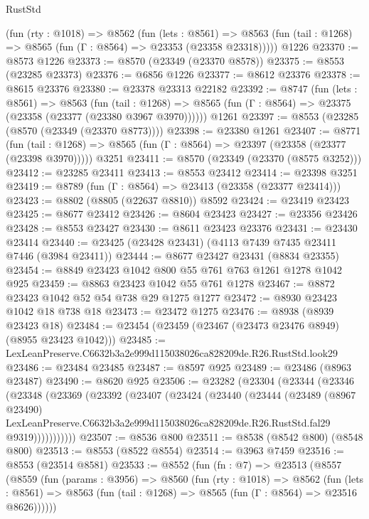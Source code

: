 \begin{lexlean}{RustStd}
\begin{coremodule}
    (fun (rty : @1018) =>
    @8562
      (fun (lets : @8561) =>
      @8563 (fun (tail : @1268) => @8565 (fun (Γ : @8564) => @23353 (@23358 @23318)))))
    @1226
@23370 := @8573 @1226
@23373 := @8570 (@23349 (@23370 @8578))
@23375 := @8553 (@23285 @23373)
@23376 := @6856 @1226
@23377 := @8612 @23376
@23378 := @8615 @23376
@23380 := @23378 @23313 @22182
@23392 := @8747
    (fun (lets : @8561) =>
    @8563
      (fun (tail : @1268) =>
      @8565 (fun (Γ : @8564) => @23375 (@23358 (@23377 (@23380 @3967 @3970))))))
    @1261
@23397 := @8553 (@23285 (@8570 (@23349 (@23370 @8773))))
@23398 := @23380 @1261
@23407 := @8771
    (fun (tail : @1268) => @8565 (fun (Γ : @8564) => @23397 (@23358 (@23377 (@23398 @3970)))))
    @3251
@23411 := @8570 (@23349 (@23370 (@8575 @3252)))
@23412 := @23285 @23411
@23413 := @8553 @23412
@23414 := @23398 @3251
@23419 := @8789 (fun (Γ : @8564) => @23413 (@23358 (@23377 @23414)))
@23423 := @8802 (@8805 (@22637 @8810)) @8592
@23424 := @23419 @23423
@23425 := @8677 @23412
@23426 := @8604 @23423
@23427 := @23356 @23426
@23428 := @8553 @23427
@23430 := @8611 @23423 @23376
@23431 := @23430 @23414
@23440 := @23425 (@23428 @23431) (@4113 @7439 @7435 @23411 @7446 (@3984 @23411))
@23444 := @8677 @23427 @23431 (@8834 @23355)
@23454 := @8849 @23423 @1042 @800 @55 @761 @763 @1261 @1278 @1042 @925
@23459 := @8863 @23423 @1042 @55 @761 @1278
@23467 := @8872 @23423 @1042 @52 @54 @738 @29 @1275 @1277
@23472 := @8930 @23423 @1042 @18 @738 @18
@23473 := @23472 @1275
@23476 := @8938 (@8939 @23423 @18)
@23484 := @23454 (@23459 (@23467 (@23473 @23476 @8949) (@8955 @23423 @1042)))
@23485 := LexLeanPreserve.C6632b3a2e999d115038026ca828209de.R26.RustStd.look29
@23486 := @23484 @23485
@23487 := @8597 @925
@23489 := @23486 (@8963 @23487)
@23490 := @8620 @925
@23506 := @23282
    (@23304
      (@23344
        (@23346
          (@23348
            (@23369
              (@23392
                (@23407
                  (@23424
                    (@23440
                      (@23444
                        (@23489
                          (@8967 @23490)
                          LexLeanPreserve.C6632b3a2e999d115038026ca828209de.R26.RustStd.fal29
                          @9319)))))))))))
@23507 := @8536 @800
@23511 := @8538 (@8542 @800) (@8548 @800)
@23513 := @8553 (@8522 @8554)
@23514 := @3963 @7459
@23516 := @8553 (@23514 @8581)
@23533 := @8552
    (fun (fn : @7) =>
    @23513
      (@8557
        (@8559
          (fun (params : @3956) =>
          @8560
            (fun (rty : @1018) =>
            @8562
              (fun (lets : @8561) =>
              @8563 (fun (tail : @1268) => @8565 (fun (Γ : @8564) => @23516 @8626))))))

\end{coremodule}
\end{lexlean}
